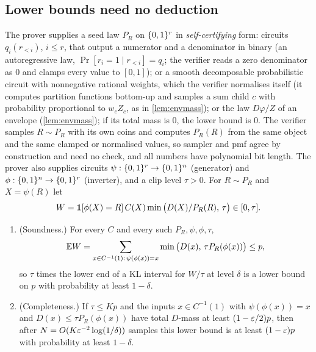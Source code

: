 \subsection{Lower bounds need no deduction}\label{sec:lower}

\begin{proposition}\label{prop:proposal}
The prover supplies a seed law $P_R$ on $\{0,1\}^r$ in \emph{self-certifying}
form: circuits $q_i(r_{<i})$, $i\le r$, that output a numerator and a denominator in
binary (an autoregressive law, $\Pr[r_i=1\mid r_{<i}]=q_i$; the verifier reads a zero
denominator as $0$ and clamps every value to $[0,1]$); or a smooth decomposable
probabilistic circuit with nonnegative rational weights, which the verifier normalises
itself (it computes partition functions bottom-up and samples a sum child $c$ with
probability proportional to $w_cZ_c$, as in \cref{lem:envmass}); or the law $D\varphi/Z$
of an envelope (\cref{lem:envmass}); if its total mass is $0$, the lower bound is $0$.
The verifier samples $R\sim P_R$ with its own coins and computes $P_R(R)$ from the
same object and the same clamped or normalised values, so sampler and pmf agree by
construction and need no check, and all numbers have polynomial bit length. The
prover also supplies circuits $\psi:\{0,1\}^r\to\{0,1\}^n$ (generator) and
$\phi:\{0,1\}^n\to\{0,1\}^r$ (inverter), and a clip level $\tau>0$. For
$R\sim P_R$ and $X=\psi(R)$ let
\[
W=\mathbf{1}[\phi(X)=R]\,C(X)\min\big(D(X)/P_R(R),\,\tau\big)\in[0,\tau].
\]
\begin{enumerate}[label=(\alph*)]
\item (Soundness.) For every $C$ and every such $P_R,\psi,\phi,\tau$,
\[
\mathbb{E} W=\sum_{x\in C^{-1}(1):\,\psi(\phi(x))=x}\min\big(D(x),\,\tau P_R(\phi(x))\big)\le p,
\]
so $\tau$ times the lower end of a KL interval for $W/\tau$ at level $\delta$
is a lower bound on $p$ with probability at least $1-\delta$.
\item (Completeness.) If $\tau\le Kp$ and the inputs $x\in C^{-1}(1)$ with
$\psi(\phi(x))=x$ and $D(x)\le\tau P_R(\phi(x))$ have total $D$-mass at least
$(1-\varepsilon/2)p$, then after $N=O(K\varepsilon^{-2}\log(1/\delta))$ samples this lower
bound is at least $(1-\varepsilon)p$ with probability at least $1-\delta$.
\end{enumerate}
\end{proposition}

